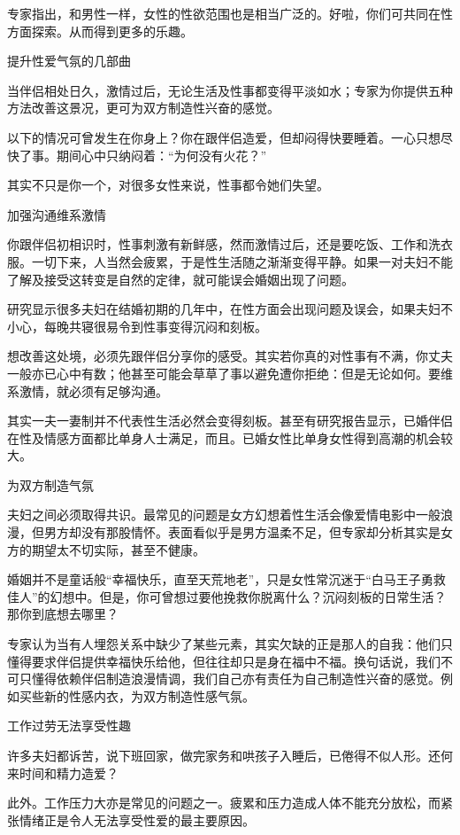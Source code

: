 \documentclass[12pt,UTF8]{ctexbook}
\begin{document}
专家指出，和男性一样，女性的性欲范围也是相当广泛的。好啦，你们可共同在性方面探索。从而得到更多的乐趣。





提升性爱气氛的几部曲


当伴侣相处日久，激情过后，无论生活及性事都变得平淡如水；专家为你提供五种方法改善这景况，更可为双方制造性兴奋的感觉。

以下的情况可曾发生在你身上？你在跟伴侣造爱，但却闷得快要睡着。一心只想尽快了事。期间心中只纳闷着：“为何没有火花？”

其实不只是你一个，对很多女性来说，性事都令她们失望。

加强沟通维系激情

你跟伴侣初相识时，性事刺激有新鲜感，然而激情过后，还是要吃饭、工作和洗衣服。一切下来，人当然会疲累，于是性生活随之渐渐变得平静。如果一对夫妇不能了解及接受这转变是自然的定律，就可能误会婚姻出现了问题。

研究显示很多夫妇在结婚初期的几年中，在性方面会出现问题及误会，如果夫妇不小心，每晚共寝很易令到性事变得沉闷和刻板。

想改善这处境，必须先跟伴侣分享你的感受。其实若你真的对性事有不满，你丈夫一般亦已心中有数；他甚至可能会草草了事以避免遭你拒绝：但是无论如何。要维系激情，就必须有足够沟通。

其实一夫一妻制并不代表性生活必然会变得刻板。甚至有研究报告显示，已婚伴侣在性及情感方面都比单身人士满足，而且。已婚女性比单身女性得到高潮的机会较大。

为双方制造气氛

夫妇之间必须取得共识。最常见的问题是女方幻想着性生活会像爱情电影中一般浪漫，但男方却没有那股情怀。表面看似乎是男方温柔不足，但专家却分析其实是女方的期望太不切实际，甚至不健康。

婚姻并不是童话般“幸福快乐，直至天荒地老”，只是女性常沉迷于“白马王子勇救佳人”的幻想中。但是，你可曾想过要他挽救你脱离什么？沉闷刻板的日常生活？那你到底想去哪里？

专家认为当有人埋怨关系中缺少了某些元素，其实欠缺的正是那人的自我：他们只懂得要求伴侣提供幸福快乐给他，但往往却只是身在福中不福。换句话说，我们不可只懂得依赖伴侣制造浪漫情调，我们自己亦有责任为自己制造性兴奋的感觉。例如买些新的性感内衣，为双方制造性感气氛。

工作过劳无法享受性趣

许多夫妇都诉苦，说下班回家，做完家务和哄孩子入睡后，已倦得不似人形。还何来时间和精力造爱？

此外。工作压力大亦是常见的问题之一。疲累和压力造成人体不能充分放松，而紧张情绪正是令人无法享受性爱的最主要原因。
\end{document}
